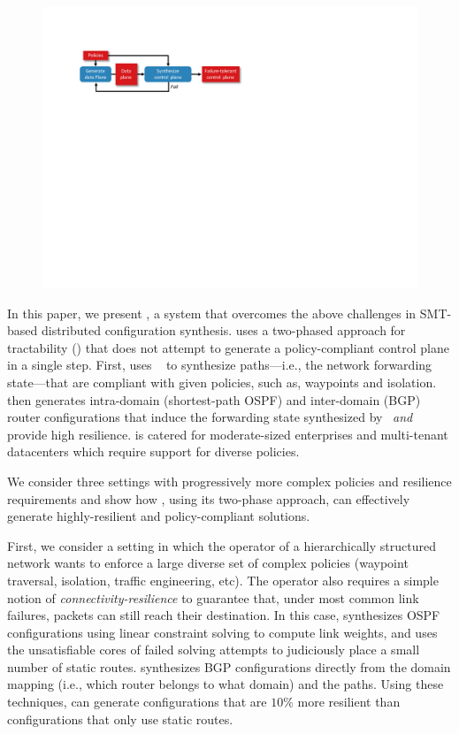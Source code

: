 \begin{figure}
	\includegraphics[width=\columnwidth]{figures/architecture.pdf}
	\label{fig:architecture}
\end{figure}

In this paper, we present \name, a system that overcomes the above
challenges in SMT-based distributed configuration synthesis.  \name
uses a two-phased approach for tractability ()
that does not attempt to generate a policy-compliant control plane in
a single step.  First, \name uses \genesis~\cite{genesis} to
synthesize paths---i.e., the network forwarding state---that are
compliant with given policies, such as, waypoints and isolation.
\name then generates intra-domain (shortest-path OSPF) and
inter-domain (BGP) router configurations that induce the forwarding
state synthesized by \genesis\ {\em and} provide high resilience. \name 
is catered for moderate-sized enterprises and multi-tenant datacenters 
which require support for diverse policies.

We consider three settings with progressively more complex policies
and resilience requirements and show how \name, using its two-phase
approach, can effectively generate highly-resilient and
policy-compliant solutions.

First, we consider a setting in which the operator of a hierarchically
structured network wants to enforce a large diverse set of complex
policies (waypoint traversal, isolation, traffic engineering, etc).
The operator also requires a simple notion of
\emph{connectivity-resilience} to guarantee that, under most common
link failures, packets can still reach their destination.  In this
case, \name synthesizes OSPF configurations using linear constraint
solving to compute link weights, and uses the unsatisfiable cores of
failed solving attempts to judiciously place a small number of static
routes.  \name synthesizes BGP configurations directly from the domain
mapping (i.e., which router belongs to what domain) and the paths.
Using these techniques, \name can generate configurations that are
$10\%$ more resilient than configurations that only use static routes.

